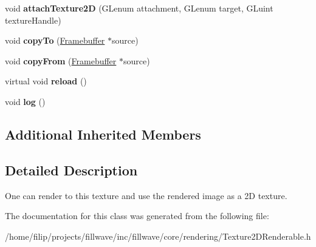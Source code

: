 \begin{DoxyCompactItemize}
void {\bfseries attach\+Texture2D} (G\+Lenum attachment, G\+Lenum target, G\+Luint texture\+Handle)
\item 
\mbox{\label{classflw_1_1flc_1_1Texture2DRenderable_a5291d5c923a6d56bbe82f837b6807fcb}} 
void {\bfseries copy\+To} (\hyperlink{classflw_1_1flc_1_1Framebuffer}{Framebuffer} $\ast$source)
\item 
\mbox{\label{classflw_1_1flc_1_1Texture2DRenderable_add3d4110613cd30046cc060543125e42}} 
void {\bfseries copy\+From} (\hyperlink{classflw_1_1flc_1_1Framebuffer}{Framebuffer} $\ast$source)
\item 
\mbox{\label{classflw_1_1flc_1_1Texture2DRenderable_a76c9e02cd82b99a1d08960d8923d6319}} 
virtual void {\bfseries reload} ()
\item 
\mbox{\label{classflw_1_1flc_1_1Texture2DRenderable_a7f4a89eb2e2304656d908d0b0efb8dcb}} 
void {\bfseries log} ()
\end{DoxyCompactItemize}
\subsection*{Additional Inherited Members}


\subsection{Detailed Description}
One can render to this texture and use the rendered image as a 2D texture. 

The documentation for this class was generated from the following file\+:\begin{DoxyCompactItemize}
\item 
/home/filip/projects/fillwave/inc/fillwave/core/rendering/Texture2\+D\+Renderable.\+h\end{DoxyCompactItemize}
